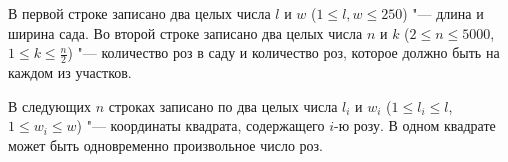В первой строке записано два целых числа $l$ и $w$ ($1 \le l, w \le 250$) "---
длина и ширина сада. Во второй строке записано два целых числа $n$ и $k$
($2 \le n \le 5000$, $1 \le k \le \frac{n}{2}$) "--- количество роз в саду и
количество роз, которое должно быть на каждом из участков.

В следующих $n$ строках записано по два целых числа $l_i$ и $w_i$
($1 \le l_i \le l$, $1 \le w_i \le w$) "--- координаты квадрата, содержащего
$i$-ю розу. В одном квадрате может быть одновременно произвольное число роз.

